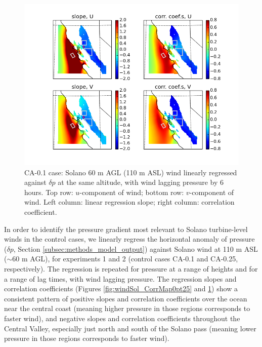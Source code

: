 \begin{figure}[here]
\includegraphics[width=1\textwidth]{ch3-wind/img/corr_wind_panom_lev110_lag12_CA0pt1.png}
\caption{CA-0.1 case: Solano 60 m AGL (110 m ASL) wind linearly regressed against $\delta p$ at the same altitude, with wind lagging pressure by 6 hours.  Top row: $u$-component of wind; bottom row: $v$-component of wind.  Left column: linear regression slope; right column: correlation coefficient.}
\label{fig:windSol_CorrMap0pt1}
\end{figure}

In order to identify the pressure gradient most relevant to Solano turbine-level winds in the control cases, we linearly regress the horizontal anomaly of pressure ($\delta p$, Section \ref{subsec:methods_model_output}) against Solano wind at 110 m ASL ($\sim$60 m AGL), for experiments 1 and 2 (control cases CA-0.1 and CA-0.25, respectively).  The regression is repeated for pressure at a range of heights and for a range of lag times, with wind lagging pressure.  The regression slopes and correlation coefficients (Figures \ref{fig:windSol_CorrMap0pt25} and \ref{fig:windSol_CorrMap0pt1}) show a consistent pattern of positive slopes and correlation coefficients over the ocean near the central coast (meaning higher pressure in those regions corresponds to faster wind), and negative slopes and correlation coefficients throughout the Central Valley, especially just north and south of the Solano pass (meaning lower pressure in those regions corresponds to faster wind).

